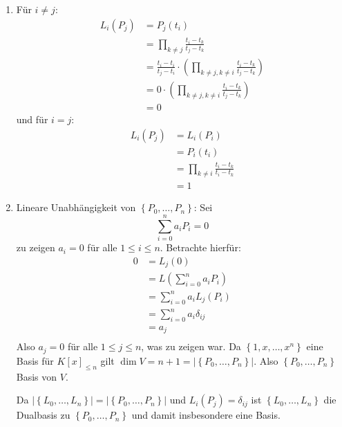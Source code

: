 \documentclass[sectionformat = aufgabe]{gadsescript}
\begin{document}
\subsection{}
\begin{enumerate}[label=(\alph*)]
	\item 
		Für $ i \neq j $:
		\begin{align*}
			L_i(P_j) &= P_j(t_i) \\
			~ &= \prod_{k \neq j} \frac{ t_i - t_k }{ t_j - t_k }  \\
			~ &= \frac{ t_i - t_i }{ t_j - t_i } \cdot \left( \prod_{k \neq j, k \neq i} \frac{ t_i - t_k }{ t_j - t_k } \right) \\
			~ &= 0 \cdot \left( \prod_{k \neq j, k \neq i} \frac{ t_i - t_k }{ t_j - t_k } \right) \\
			~ &= 0
		\end{align*}
		und für $ i = j $:
		\begin{align*}
			L_i(P_j) &= L_i(P_i) \\
			~ &= P_i(t_i) \\
			~ &= \prod_{k \neq i} \frac{ t_i - t_k }{ t_i - t_k }  \\
			~ &= 1
		\end{align*}
	\item Lineare Unabhängigkeit von $ \left\{ P_0, \dotsc, P_n \right\}  $: Sei
		\[
			\sum_{i=0}^{n} a_iP_i = 0
		\]
		zu zeigen $ a_i = 0 $ für alle $ 1 \leq i \leq n $.
		Betrachte hierfür:
		\begin{align*}
			0 &= L_j(0) \\
			~ &= L\left( \sum_{i=0}^{n} a_iP_i \right)  \\
			~ &= \sum_{i=0}^{n} a_iL_j(P_i) \\
			~ &= \sum_{i = 0} ^n a_i \delta_{ij}  \\
			~ &= a_j \\
		\end{align*}
		Also $ a_j = 0 $ für alle $ 1 \leq j \leq n $, was zu zeigen war.
		Da $ \left\{ 1, x, \dotsc, x^n \right\}  $ eine Basis für $ K[x]_{\leq n}  $ gilt $ \dim V = n + 1 = \left| \left\{ P_0, \dotsc, P_n \right\}  \right|  $.
		Also $ \left\{ P_0, \dotsc, P_n \right\}  $ Basis von $ V $.

		Da $ \left| \left\{ L_0, \dotsc, L_n \right\}  \right| = \left| \left\{ P_0, \dotsc, P_n \right\}  \right|  $ und $ L_i(P_j) = \delta_{ij}  $ ist $ \left\{ L_0, \dotsc, L_n \right\}  $ die Dualbasis zu $ \left\{ P_0, \dotsc, P_n \right\}  $ und damit insbesondere eine Basis.
\end{enumerate}
\end{document}
